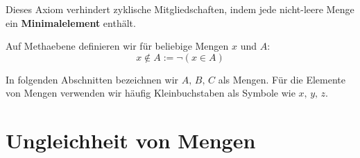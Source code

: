 \documentclass[main.tex]{subfiles}
\begin{document}
%
{%
%
}

%
{%
%
}
\begin{tabproof}
\end{tabproof}



\begin{remark}
Dieses Axiom verhindert zyklische Mitgliedschaften, indem jede nicht-leere Menge ein 
\textbf{Minimalelement} enthält.    
\end{remark}





Auf Methaebene definieren wir für beliebige Mengen \(x\) und \(A\): \[x\not\in A:=\neg(x\in A)\]

\begin{remark}
In folgenden Abschnitten bezeichnen wir \(A,\, B,\, C\) als Mengen. Für die Elemente von Mengen verwenden wir häufig Kleinbuchstaben als Symbole wie \(x,\, y,\, z\).
\end{remark}

\section{Ungleichheit von Mengen}
\end{document}
